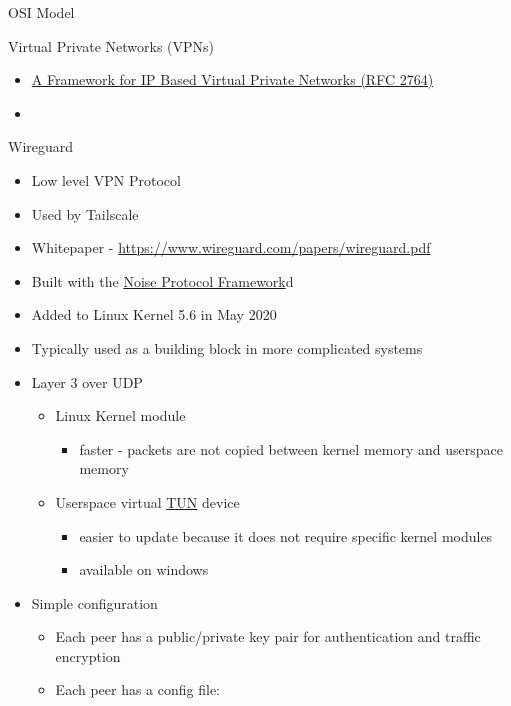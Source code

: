 \begin{frame}[fragile]{OSI Model}
\begin{block}{Virtual Private Networks (VPNs)}
\begin{itemize}
  \begin{itemize}
  \tightlist
  \item
    \href{https://www.rfc-editor.org/rfc/rfc2764.html}{A Framework for
    IP Based Virtual Private Networks (RFC 2764)}
  \item
  \end{itemize}
\end{itemize}
\end{block}

\begin{block}{Wireguard}
\protect\hypertarget{wireguard}{}
\begin{itemize}
\tightlist
\item
  Low level VPN Protocol
\item
  Used by Tailscale
\item
  Whitepaper - \url{https://www.wireguard.com/papers/wireguard.pdf}
\item
  Built with the \href{notes/02022-noise.md}{Noise Protocol Framework}d
\item
  Added to Linux Kernel 5.6 in May 2020
\item
  Typically used as a building block in more complicated systems
\item
  Layer 3 over UDP

  \begin{itemize}
  \tightlist
  \item
    Linux Kernel module

    \begin{itemize}
    \tightlist
    \item
      faster - packets are not copied between kernel memory and
      userspace memory
    \end{itemize}
  \item
    Userspace virtual \href{notes/02021-internet-protocol}{TUN} device

    \begin{itemize}
    \tightlist
    \item
      easier to update because it does not require specific kernel
      modules
    \item
      available on windows
    \end{itemize}
  \end{itemize}
\item
  Simple configuration

  \begin{itemize}
  \tightlist
  \item
    Each peer has a public/private key pair for authentication and
    traffic encryption
  \item
    Each peer has a config file:
  \end{itemize}
\end{itemize}


\end{block}
\end{frame}
